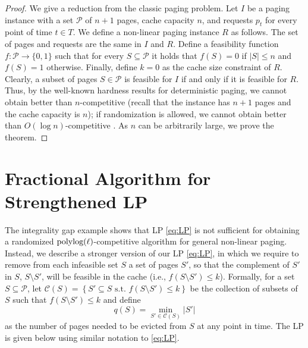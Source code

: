 \documentclass[11pt]{article}
\newcommand{\cC}{{\mathcal{C}}}
\newcommand{\cP}{{\mathcal{P}}}
\begin{document}
\begin{proof}
We give a reduction from the classic paging problem. Let $I$ be a paging instance with a set $\cP$ of $n+1$ pages, cache capacity $n$, and requests $p_t$ for every point of time $t \in T$. We define a non-linear paging instance $R$ as follows. The set of pages and requests are the same in $I$ and $R$. Define a feasibility function $f:\cP \rightarrow \{0,1\}$ such that for every $S \subseteq \cP$ it holds that $f(S) = 0$ if $|S| \leq n$ and $f(S) = 1$ otherwise. Finally, define $k = 0$ as the cache size constraint of $R$. Clearly, a subset of pages $S \in \cP$ is feasible for $I$ if and only if it is feasible for $R$. Thus, by the well-known hardness results for deterministic paging, we cannot obtain better than $n$-competitive \cite{sleator1985amortized} (recall that the instance has $n+1$ pages and the cache capacity is $n$); if randomization is allowed, we cannot obtain better than $O(\log n)$-competitive \cite{fiat1991competitive}. As $n$ can be arbitrarily large, we prove the theorem.  
\end{proof}







\section{Fractional Algorithm for Strengthened LP}%
\label{sec:stronger}


The integrality gap example shows that LP \eqref{eq:LP} is not sufficient for obtaining a randomized $\textnormal{polylog}(\ell)$-competitive algorithm for general non-linear paging. Instead, we describe a stronger version of our LP \eqref{eq:LP}, %
in which we require to remove from each infeasible set $S$ a set of pages $S'$, so that the complement of $S'$ in $S$, $S \setminus S'$, will be feasible in the cache (i.e., $ f\left(S \setminus S'\right) \leq k$).  
Formally, for a set $S \subseteq \cP$, let $\cC(S) = \left\{S' \subseteq S \text{ s.t. } f\left(S \setminus S'\right) \leq k\right\}$ be the collection of subsets of $S$ such that $ f\left(S \setminus S'\right) \leq k$ and define
\begin{equation}
	\label{eq:q(S)}
	q(S) = \min_{S' \in \cC(S)} \left|S'\right|
\end{equation}
as the number of pages needed to be evicted from $S$ at any point in time. 
The LP is given below using similar notation to \eqref{eq:LP}.
\end{document}

